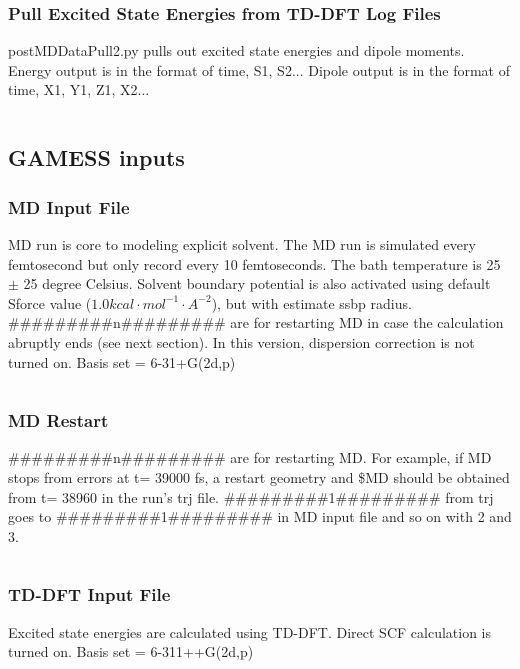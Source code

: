\documentclass[
journal=jpcbfk, %
manuscript=article]{achemso}
\begin{document}
		\subsubsection{Pull Excited State Energies from TD-DFT Log Files}
			postMDDataPull2.py pulls out excited state energies and dipole moments. Energy output is in the format of time, S1, S2... Dipole output is in the format of time, X1, Y1, Z1, X2...
			\inputminted[linenos, breaklines, baselinestretch=1, fontsize=\small]{python}{../pythonScripts/postMDDataPull2.py} 
		
	\subsection{GAMESS inputs}
		\subsubsection{MD Input File}
			 MD run is core to modeling explicit solvent. The MD run is simulated every femtosecond but only record every 10 femtoseconds. The bath temperature is 25 $\pm$ 25 degree Celsius. Solvent boundary potential is also activated using default Sforce value (\(1.0 kcal\cdot mol^{-1}\cdot A^{-2}\)), but with estimate ssbp radius. \#\#\#\#\#\#\#\#\#n\#\#\#\#\#\#\#\#\# are for restarting MD in case the calculation abruptly ends (see next section). In this version, dispersion correction is not turned on. Basis set = 6-31+G(2d,p)
			 \inputminted[linenos, breaklines, baselinestretch=1, fontsize=\small]{Perl}{../GAMESSinpSample/MD_aniline32.inp}
			 
		\subsubsection{MD Restart}
		\#\#\#\#\#\#\#\#\#n\#\#\#\#\#\#\#\#\# are for restarting MD. For example, if MD stops from errors at t= 39000 fs, a restart geometry and \$MD should be obtained from t= 38960 in the run's trj file. \#\#\#\#\#\#\#\#\#1\#\#\#\#\#\#\#\#\# from trj goes to \#\#\#\#\#\#\#\#\#1\#\#\#\#\#\#\#\#\# in MD input file and so on with 2 and 3.
		\inputminted[linenos, breaklines, baselinestretch=1, fontsize=\small]{Perl}{../GAMESSinpSample/MD_aniline32.trj}
		
		\subsubsection{TD-DFT Input File}
			Excited state energies are calculated using TD-DFT. Direct SCF calculation is turned on. Basis set = 6-311++G(2d,p)
			\inputminted[linenos, breaklines, baselinestretch=1, fontsize=\small]{Perl}{../GAMESSinpSample/TDDFT_aniline32_15010.inp}
\clearpage


\end{document}
